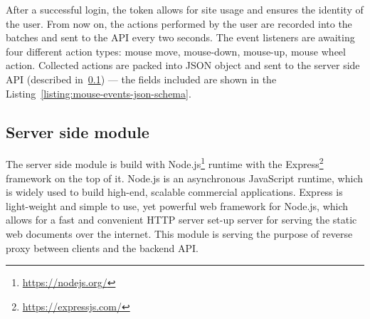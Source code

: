 After a successful login, the token allows for site usage and ensures the identity of the user.
From now on, the actions performed by the user are recorded into the batches and sent to the API every two seconds.
The event listeners are awaiting four different action types: mouse move, mouse-down, mouse-up, mouse wheel action.
Collected actions are packed into JSON object and sent to the server side API (described in~\ref{subsec:server-side-module}) --- the fields included are shown in the Listing~\ref{listing:mouse-events-json-schema}.



\subsection{Server side module}\label{subsec:server-side-module}
The server side module is build with Node.js\footnote{\url{https://nodejs.org/}} runtime with the Express\footnote{\url{https://expressjs.com/}} framework on the top of it.
Node.js is an asynchronous JavaScript runtime, which is widely used to build high-end, scalable commercial applications.
Express is light-weight and simple to use, yet powerful web framework for Node.js, which allows for a fast and convenient HTTP server set-up server for serving the static web documents over the internet.
This module is serving the purpose of reverse proxy between clients and the backend API.

